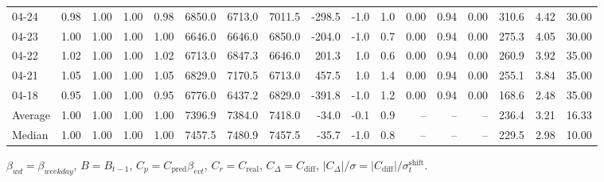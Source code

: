 \begin{threeparttable}
{\begin{tabular}{lrrrrrrrrrrrrrrrr}
  04-24 &         0.98 &           1.00 &          1.00 &          0.98 & 6850.0 & 6713.0 & 7011.5 &     -298.5 &                     -1.0 &                 1.0 &       0.00 &      0.94 &           0.00 &            310.6 &            4.42 &                  30.00 \\
  04-23 &         1.00 &           1.00 &          1.00 &          1.00 & 6646.0 & 6646.0 & 6850.0 &     -204.0 &                     -1.0 &                 0.7 &       0.00 &      0.94 &           0.00 &            275.3 &            4.05 &                  30.00 \\
  04-22 &         1.02 &           1.00 &          1.00 &          1.02 & 6713.0 & 6847.3 & 6646.0 &      201.3 &                      1.0 &                 0.6 &       0.00 &      0.94 &           0.00 &            260.9 &            3.92 &                  35.00 \\
  04-21 &         1.05 &           1.00 &          1.00 &          1.05 & 6829.0 & 7170.5 & 6713.0 &      457.5 &                      1.0 &                 1.4 &       0.00 &      0.94 &           0.00 &            255.1 &            3.84 &                  35.00 \\
  04-18 &         0.95 &           1.00 &          1.00 &          0.95 & 6776.0 & 6437.2 & 6829.0 &     -391.8 &                     -1.0 &                 1.2 &       0.00 &      0.94 &           0.00 &            168.6 &            2.48 &                  35.00 \\
Average &         1.00 &           1.00 &          1.00 &          1.00 & 7396.9 & 7384.0 & 7418.0 &      -34.0 &                     -0.1 &                 0.9 &         -- &        -- &             -- &            236.4 &            3.21 &                  16.33 \\
 Median &         1.00 &           1.00 &          1.00 &          1.00 & 7457.5 & 7480.9 & 7457.5 &      -35.7 &                     -1.0 &                 0.8 &         -- &        -- &             -- &            229.5 &            2.98 &                  10.00 \\
\bottomrule
\end{tabular}
}
\begin{tablenotes}\footnotesize
\item $\beta_{wd}=\beta_{weekday}$, $B=B_{t-1}$,
$C_p=C_{\text{pred}}\beta_{evt}$, $C_r=C_{\text{real}}$,
$C_\Delta=C_{\text{diff}}$, $|C_\Delta|/\sigma=|C_{\text{diff}}|/\sigma_t^{\text{shift}}$.
\end{tablenotes}
\end{threeparttable}
\endgroup
